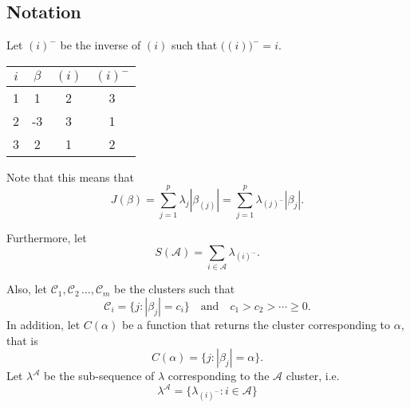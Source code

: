 \subsection{Notation}\label{sec:notation}

Let \((i)^{-}\) be the inverse of \((i)\) such that
\(\big((i)\big)^- = i\).
\begin{example}
  \begin{tabular}{cccc}
    \toprule
    \(i\) & \(\beta\) & \((i)\) & \((i)^-\) \\
    \midrule
    1     & 1         & 2       & 3         \\
    2     & -3        & 3       & 1         \\
    3     & 2         & 1       & 2         \\
    \bottomrule
  \end{tabular}
\end{example}
Note that this means that
\[
  J(\beta) = \sum_{j=1}^p \lambda_j |\beta_{(j)}|
           = \sum_{j=1}^p \lambda_{(j)^-}|\beta_j|.
\]

Furthermore, let
\[
  S(\mathcal{A}) = \sum_{i \in \mathcal{A}} \lambda_{(i)^-}.
\]

Also, let \(\mathcal{C}_1, \mathcal{C}_2\, \dots, \mathcal{C}_m\) be the
clusters such that
\[
  \mathcal{C}_i = \{j : |\beta_j| = c_i\} \quad \text{and} \quad
  c_1 > c_2 > \cdots \geq 0.
\]
In addition, let \(C(\alpha)\) be a function that returns the
cluster corresponding to \(\alpha\), that is
\[
  C(\alpha) = \{j : |\beta_j| = \alpha\}.
\]
Let \(\lambda^{\mathcal{A}}\) be the sub-sequence of
\(\lambda\) corresponding to the \(\mathcal{A}\) cluster, i.e.
\[
  \lambda^\mathcal{A} = \{\lambda_{(i)^-} : i \in \mathcal{A}\}
\]




